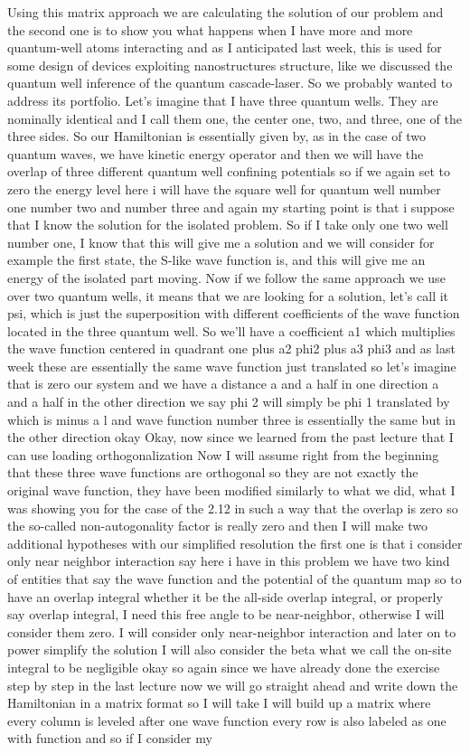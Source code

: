 Using this matrix approach we are calculating the solution of our problem and the second one is to show you what happens when I have more and more quantum-well atoms interacting and as I anticipated last week, this is used for some design of devices exploiting nanostructures structure, like we discussed the quantum well inference of the quantum cascade-laser. So we probably wanted to address its portfolio. Let's imagine that I have three quantum wells. They are nominally identical and I call them one, the center one, two, and three, one of the three sides. So our Hamiltonian is essentially given by, as in the case of two quantum waves, we have kinetic energy operator and then we will have the overlap of three different quantum well confining potentials so if we again set to zero the energy level here i will have the square well for quantum well number one number two and number three and again my starting point is that i suppose that I know the solution for the isolated problem. So if I take only one two well number one, I know that this will give me a solution and we will consider for example the first state, the S-like wave function is, and this will give me an energy of the isolated part moving. Now if we follow the same approach we use over two quantum wells, it means that we are looking for a solution, let's call it psi, which is just the superposition with different coefficients of the wave function located in the three quantum well. So we'll have a coefficient a1 which multiplies the wave function centered in quadrant one plus a2 phi2 plus a3 phi3 and as last week these are essentially the same wave function just translated so let's imagine that is zero our system and we have a distance a and a half in one direction a and a half in the other direction we say phi 2 will simply be phi 1 translated by which is minus a l and wave function number three is essentially the same but in the other direction okay Okay, now since we learned from the past lecture that I can use loading orthogonalization Now I will assume right from the beginning that these three wave functions are orthogonal so they are not exactly the original wave function, they have been modified similarly to what we did, what I was showing you for the case of the 2.12 in such a way that the overlap is zero so the so-called non-autogonality factor is really zero and then I will make two additional hypotheses with our simplified resolution the first one is that i consider only near neighbor interaction say here i have in this problem we have two kind of entities that say the wave function and the potential of the quantum map so to have an overlap integral whether it be the all-side overlap integral, or properly say overlap integral, I need this free angle to be near-neighbor, otherwise I will consider them zero. I will consider only near-neighbor interaction and later on to power simplify the solution I will also consider the beta what we call the on-site integral to be negligible okay so again since we have already done the exercise step by step in the last lecture now we will go straight ahead and write down the Hamiltonian in a matrix format so I will take I will build up a matrix where every column is leveled after one wave function every row is also labeled as one with function and so if I consider my 
